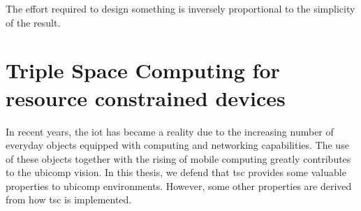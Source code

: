 

\begin{savequote}[50mm]
The effort required to design something is inversely proportional to the simplicity of the result.%
\end{savequote}


\newcommand{\codigo}[1]{``\texttt{#1}''}
\newcommand{\primquery}{\emph{query}}
\newcommand{\primread}{\emph{read}}
\newcommand{\primtake}{\emph{take}}
\newcommand{\primwrite}{\emph{write}}


\chapter{Triple Space Computing for resource constrained devices}
\label{cha:tsc}
\newcommand{\pathchapthree}{3_tsc}

\ifpdf
    \graphicspath{{\pathchapthree/figures/PNG/}{\pathchapthree/figures/PDF/}{\pathchapthree/figures/}}
\else
    \graphicspath{{\pathchapthree/figures/EPS/}{\pathchapthree/figures/}}
\fi









In recent years, the \acf{iot} has became a reality due to the increasing number of everyday objects equipped with computing and networking capabilities.
The use of these objects together with the rising of mobile computing greatly contributes to the \ac{ubicomp} vision.
In this thesis, we defend that \acf{tsc} provides some valuable properties to \ac{ubicomp} environments. %
However, some other properties are derived from how \ac{tsc} is implemented. %


